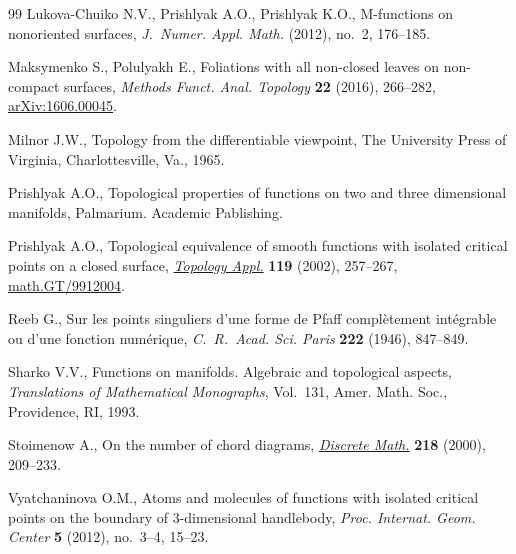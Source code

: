 \documentclass[10pt,a4paper]{amsart}
\numberwithin{equation}{section}
\begin{document}
\begin{thebibliography}{99}
Lukova-Chuiko N.V., Prishlyak A.O., Prishlyak K.O., M-functions on nonoriented
 surfaces, \textit{J.~Numer. Appl. Math.} (2012), no.~2, 176--185.

Maksymenko S., Polulyakh E., Foliations with all non-closed leaves on
 non-compact surfaces, \textit{Methods Funct. Anal. Topology} \textbf{22}
 (2016), 266--282, \href{https://arxiv.org/abs/1606.00045}{arXiv:1606.00045}.

Milnor J.W., Topology from the dif\/ferentiable viewpoint, The University Press
 of Virginia, Charlottesville, Va., 1965.

Prishlyak A.O., Topological properties of functions on two and three
 dimensional manifolds, Palmarium. Academic Pablishing.

Prishlyak A.O., Topological equivalence of smooth functions with isolated
 critical points on a closed surface, \href{https://doi.org/10.1016/S0166-8641(01)00077-3}{\textit{Topology Appl.}} \textbf{119}
 (2002), 257--267, \href{https://arxiv.org/abs/math.GT/9912004}{math.GT/9912004}.

Reeb G., Sur les points singuliers d'une forme de {P}faf\/f compl\`etement
 int\'egrable ou d'une fonction num\'erique, \textit{C.~R.~Acad. Sci. Paris}
 \textbf{222} (1946), 847--849.

Sharko V.V., Functions on manifolds. Algebraic and topological aspects,
 \textit{Translations of Mathematical Monographs}, Vol.~131, Amer. Math. Soc.,
 Providence, RI, 1993.

Stoimenow A., On the number of chord diagrams, \href{https://doi.org/10.1016/S0012-365X(99)00347-7}{\textit{Discrete Math.}}
 \textbf{218} (2000), 209--233.

Vyatchaninova O.M., Atoms and molecules of functions with isolated critical
 points on the boundary of 3-dimensional handlebody, \textit{Proc. Internat.
 Geom. Center} \textbf{5} (2012), no.~3--4, 15--23.

\end{thebibliography}
\end{document}
